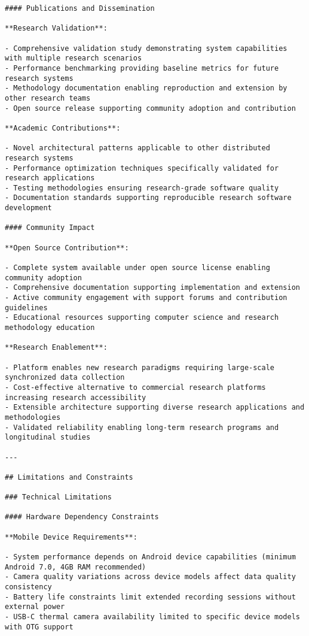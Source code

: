 \documentclass[11pt,a4paper]{report}
\begin{document}
\begin{verbatim}
#### Publications and Dissemination

**Research Validation**:

- Comprehensive validation study demonstrating system capabilities with multiple research scenarios
- Performance benchmarking providing baseline metrics for future research systems
- Methodology documentation enabling reproduction and extension by other research teams
- Open source release supporting community adoption and contribution

**Academic Contributions**:

- Novel architectural patterns applicable to other distributed research systems
- Performance optimization techniques specifically validated for research applications
- Testing methodologies ensuring research-grade software quality
- Documentation standards supporting reproducible research software development

#### Community Impact

**Open Source Contribution**:

- Complete system available under open source license enabling community adoption
- Comprehensive documentation supporting implementation and extension
- Active community engagement with support forums and contribution guidelines
- Educational resources supporting computer science and research methodology education

**Research Enablement**:

- Platform enables new research paradigms requiring large-scale synchronized data collection
- Cost-effective alternative to commercial research platforms increasing research accessibility
- Extensible architecture supporting diverse research applications and methodologies
- Validated reliability enabling long-term research programs and longitudinal studies

---

## Limitations and Constraints

### Technical Limitations

#### Hardware Dependency Constraints

**Mobile Device Requirements**:

- System performance depends on Android device capabilities (minimum Android 7.0, 4GB RAM recommended)
- Camera quality variations across device models affect data quality consistency
- Battery life constraints limit extended recording sessions without external power
- USB-C thermal camera availability limited to specific device models with OTG support


\end{verbatim}
\end{document}
